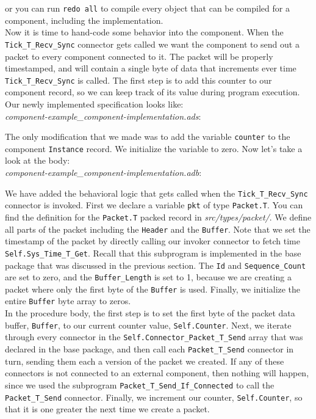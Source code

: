 or you can run \texttt{redo all} to compile every object that can be compiled for a component, including the implementation. \\

Now it is time to hand-code some behavior into the component. When the \texttt{Tick\_T\_Recv\_Sync} connector gets called we want the component to send out a packet to every component connected to it. The packet will be properly timestamped, and will contain a single byte of data that increments ever time \texttt{Tick\_T\_Recv\_Sync} is called. The first step is to add this counter to our component record, so we can keep track of its value during program execution. Our newly implemented specification looks like: \\

\textit{component-example\_component-implementation.ads}:

The only modification that we made was to add the variable \texttt{counter} to the component \texttt{Instance} record. We initialize the variable to zero. Now let's take a look at the body: \\

\textit{component-example\_component-implementation.adb}:

We have added the behavioral logic that gets called when the \texttt{Tick\_T\_Recv\_Sync} connector is invoked. First we declare a variable \texttt{pkt} of type \texttt{Packet.T}. You can find the definition for the \texttt{Packet.T} packed record in \textit{src/types/packet/}. We define all parts of the packet including the \texttt{Header} and the \texttt{Buffer}. Note that we set the timestamp of the packet by directly calling our invoker connector to fetch time \texttt{Self.Sys\_Time\_T\_Get}. Recall that this subprogram is implemented in the base package that was discussed in the previous section. The \texttt{Id} and \texttt{Sequence\_Count} are set to zero, and the \texttt{Buffer\_Length} is set to 1, because we are creating a packet where only the first byte of the \texttt{Buffer} is used. Finally, we initialize the entire \texttt{Buffer} byte array to zeros. \\

In the procedure body, the first step is to set the first byte of the packet data buffer, \texttt{Buffer}, to our current counter value, \texttt{Self.Counter}. Next, we iterate through every connector in the \texttt{Self.Connector\_Packet\_T\_Send} array that was declared in the base package, and then call each \texttt{Packet\_T\_Send} connector in turn, sending them each a version of the packet we created. If any of these connectors is not connected to an external component, then nothing will happen, since we used the subprogram \texttt{Packet\_T\_Send\_If\_Connected} to call the \texttt{Packet\_T\_Send} connector. Finally, we increment our counter, \texttt{Self.Counter}, so that it is one greater the next time we create a packet. \\

